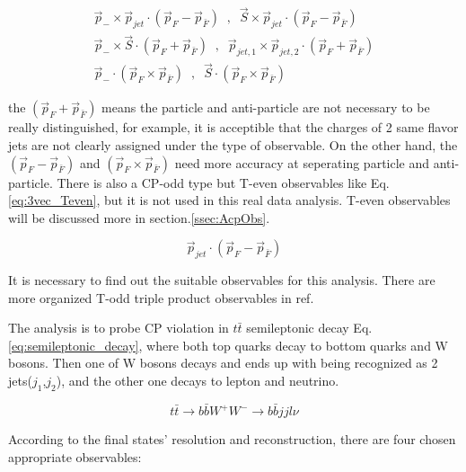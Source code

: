 	\begin{equation}
	\begin{split}
	\vec{p}_- \times \vec{p}_{jet} \cdot ( \vec{p}_F - \vec{p}_{\bar{F}} ) \;\;, \;\; \vec{S} \times \vec{p}_{jet} \cdot ( \vec{p}_F - \vec{p}_{\bar{F}} ) \\
	\vec{p}_- \times \vec{S} \cdot ( \vec{p}_F + \vec{p}_{\bar{F}} ) \;\;, \;\; \vec{p}_{jet,1} \times \vec{p}_{jet,2} \cdot ( \vec{p}_F + \vec{p}_{\bar{F}} ) \\
	\vec{p}_- \cdot ( \vec{p}_F \times \vec{p}_{\bar{F}} ) \;\;,\;\; \vec{S} \cdot ( \vec{p}_F \times \vec{p}_{\bar{F}} )
	\label{eq:semi_inclusive_obs}
	\end{split}
	\end{equation}

	the $(\vec{p}_F + \vec{p}_{\bar{F}})$ means the particle and anti-particle are not necessary to be really distinguished, for example, it is acceptible that the charges of 2 same flavor jets are not clearly assigned under the type of observable. On the other hand, the $(\vec{p}_F - \vec{p}_{\bar{F}})$ and $(\vec{p}_F \times \vec{p}_{\bar{F}})$ need more accuracy at seperating particle and anti-particle. There is also a CP-odd type but T-even observables like Eq.\ref{eq:3vec_Teven}, but it is not used in this real data analysis. T-even observables will be discussed more in section.\ref{ssec:AcpObs}.

	\begin{equation}
	\vec{p}_{jet} \cdot ( \vec{p}_F - \vec{p}_{\bar{F}} )
	\label{eq:3vec_Teven}
	\end{equation}

	It is necessary to find out the suitable observables for this analysis. There are more organized T-odd triple product observables in ref.\cite{Hayreter:2015ryk}


	The analysis is to probe CP violation in $t\bar{t}$ semileptonic decay Eq.\ref{eq:semileptonic_decay}, where both top quarks decay to bottom quarks and W bosons. Then one of W bosons decays and ends up with being recognized as 2 jets($j_1$,$j_2$), and the other one decays to lepton and neutrino. 

	\begin{equation}
	t\bar{t} \rightarrow b\bar{b} W^+W^- \rightarrow b\bar{b} jj l \nu
	\label{eq:semileptonic_decay}
	\end{equation}

	According to the final states' resolution and reconstruction, there are four chosen appropriate observables:

